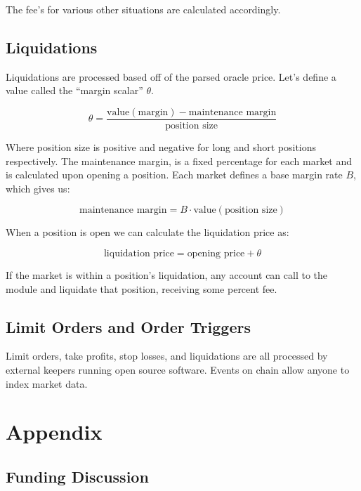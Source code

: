 \documentclass[letterpaper]{article}
\begin{document}
\begin{multicols}{2}
The fee's for various other situations are calculated accordingly.

\subsection{Liquidations}

Liquidations are processed based off of the parsed oracle price. Let's define a value called the ``margin scalar'' $\theta$. 

\begin{equation}
    \theta = \frac{\text{value}(\text{margin}) - \text{maintenance margin}}{\text{position size}}
\end{equation}

Where position size is positive and negative for long and short positions respectively. The maintenance margin, is a fixed percentage for each market and is calculated upon opening a position. Each market defines a base margin rate $B$, which gives us:

\begin{equation}
    \text{maintenance margin} = B \cdot \text{value}(\text{position size})
\end{equation}

When a position is open we can calculate the liquidation price as:

\begin{equation}
    \label{eq:liquidation-price}
    \text{liquidation price} = \text{opening price} + \theta
\end{equation}

If the market is within a position's liquidation, any account can call to the module and liquidate that position, receiving some percent fee.

\subsection{Limit Orders and Order Triggers}

Limit orders, take profits, stop losses, and liquidations are all processed by external keepers running open source software. Events on chain allow anyone to index market data.

\appendix

\section*{Appendix}

\subsection*{Funding Discussion}


\end{multicols}
\end{document}
